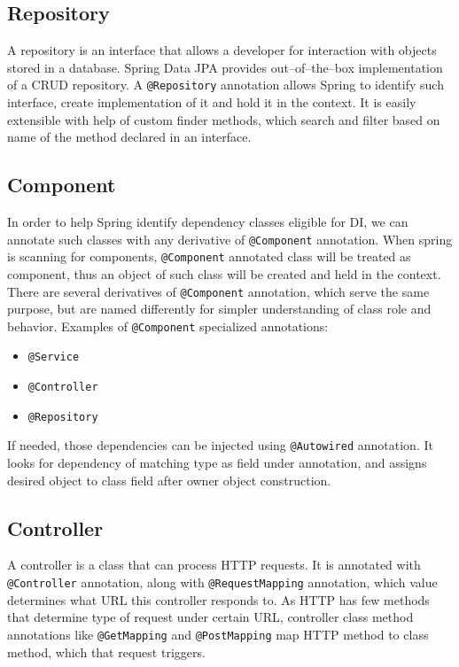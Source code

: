 \documentclass[a4paper,twoside,12pt]{book}
\begin{document}
    \subsection{Repository}
      A repository is an interface that allows a developer for interaction with objects stored in a database.
      Spring Data JPA provides out--of--the--box implementation of a CRUD repository.
      A \lstinline|@Repository| annotation allows Spring to identify such interface, create implementation of it and hold it in the context.
      It is easily extensible with help of custom finder methods, which search and filter based on name of the method declared in an interface.

    \subsection{Component}
      In order to help Spring identify dependency classes eligible for DI, we can annotate such classes with any derivative of \lstinline|@Component| annotation.
      When spring is scanning for components, \lstinline|@Component| annotated class will be treated as component, thus an object of such class will be created and held in the context.
      There are several derivatives of \lstinline|@Component| annotation, which serve the same purpose, but are named differently for simpler understanding of class role and behavior.
      Examples of \lstinline|@Component| specialized annotations:
      \begin{itemize}
        \item \lstinline|@Service|
        \item \lstinline|@Controller|
        \item \lstinline|@Repository|
      \end{itemize}
      If needed, those dependencies can be injected using \lstinline|@Autowired| annotation.
      It looks for dependency of matching type as field under annotation, and assigns desired object to class field after owner object construction.

    \subsection{Controller}
      A controller is a class that can process HTTP requests. It is annotated with \lstinline|@Controller| annotation, along with \lstinline|@RequestMapping| annotation, 
      which value determines what URL this controller responds to.
      As HTTP has few methods that determine type of request under certain URL, controller class method annotations like \lstinline|@GetMapping| and \lstinline|@PostMapping|
      map HTTP method to class method, which that request triggers.
\end{document}
